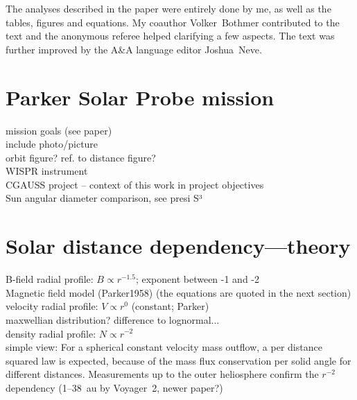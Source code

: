 The analyses described in the paper were entirely done by me, as well as the tables, figures and equations. My coauthor Volker~Bothmer contributed to the text and the anonymous referee helped clarifying a few aspects. The text was further improved by the A\&A language editor Joshua~Neve.\\


\section{Parker Solar Probe mission}

mission goals (see paper)\\
include photo/picture\\
orbit figure? ref. to distance figure?\\
WISPR instrument\\
CGAUSS project -- context of this work in project objectives\\
Sun angular diameter comparison, see presi S³\\


\section{Solar distance dependency---theory}
B-field radial profile: $B \propto r^{-1.5}$; exponent between -1 and -2\\
	Magnetic field model (Parker1958) (the equations are quoted in the next section)\\
velocity radial profile: $V \propto r^{0}$ (constant; Parker)\\
	maxwellian distribution? difference to lognormal...\\
density radial profile: $N \propto r^{-2}$\\
	simple view: For a spherical constant velocity mass outflow, a per distance squared law is expected, because of the mass flux conservation per solid angle for different distances. Measurements up to the outer heliosphere confirm the $r^{-2}$ dependency (1--38~au by Voyager~2, \citep{Belcher1993} newer paper?)\\

